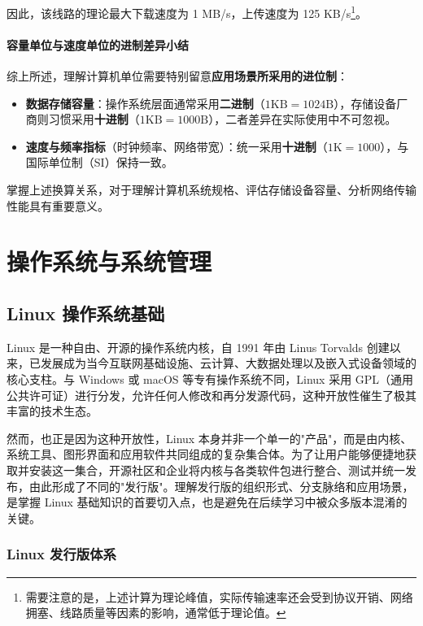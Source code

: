 \documentclass[12pt,UTF8]{ctexbook}
\begin{document}
因此，该线路的理论最大下载速度为 1 MB/s，上传速度为 125 KB/s\footnote{需要注意的是，上述计算为理论峰值，实际传输速率还会受到协议开销、网络拥塞、线路质量等因素的影响，通常低于理论值。}。

\subsection{容量单位与速度单位的进制差异小结}

综上所述，理解计算机单位需要特别留意\textbf{应用场景所采用的进位制}：

\begin{itemize}
	\item \textbf{数据存储容量}：操作系统层面通常采用\textbf{二进制}（$1\text{KB} = 1024\text{B}$），存储设备厂商则习惯采用\textbf{十进制}（$1\text{KB} = 1000\text{B}$），二者差异在实际使用中不可忽视。
	\item \textbf{速度与频率指标}（时钟频率、网络带宽）：统一采用\textbf{十进制}（$1\text{K} = 1000$），与国际单位制（SI）保持一致。
\end{itemize}

掌握上述换算关系，对于理解计算机系统规格、评估存储设备容量、分析网络传输性能具有重要意义。

\part{操作系统与系统管理}

\chapter{Linux 操作系统基础}
\label{chap:linux-basics}

Linux 是一种自由、开源的操作系统内核，自 1991 年由 Linus Torvalds 创建以来，已发展成为当今互联网基础设施、云计算、大数据处理以及嵌入式设备领域的核心支柱。与 Windows 或 macOS 等专有操作系统不同，Linux 采用 GPL（通用公共许可证）进行分发，允许任何人修改和再分发源代码，这种开放性催生了极其丰富的技术生态。

然而，也正是因为这种开放性，Linux 本身并非一个单一的"产品"，而是由内核、系统工具、图形界面和应用软件共同组成的复杂集合体。为了让用户能够便捷地获取并安装这一集合，开源社区和企业将内核与各类软件包进行整合、测试并统一发布，由此形成了不同的"发行版"。理解发行版的组织形式、分支脉络和应用场景，是掌握 Linux 基础知识的首要切入点，也是避免在后续学习中被众多版本混淆的关键。

\section{Linux 发行版体系}
\end{document}
